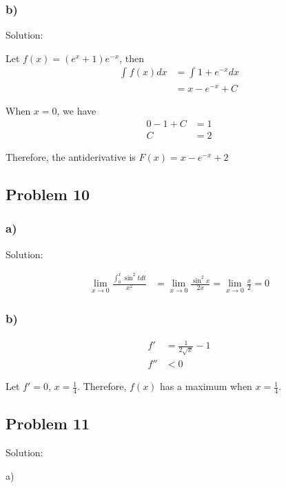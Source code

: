 \documentclass[letterpaper, 11pt]{article}
\newcommand{\1}{\mathds{1}}	%
\theoremstyle{definition}
\begin{document}
\subsubsection*{b)}

Solution:

Let $f(x) = (e ^{x} + 1) e ^{-x}$, then
\begin{align*}
  \int_{}^{} f(x) dx &= \int_{}^{} 1 + e ^{-x} dx \\
  &= x - e ^{-x} + C
\end{align*}

When $x = 0$, we have \begin{align*}
  0 - 1 + C &= 1 \\
  C &= 2
\end{align*}

Therefore, the antiderivative is $F(x) = x - e ^{ -x } + 2$

\subsection*{Problem 10}

\subsubsection*{a)}

Solution:

\begin{align*}
  \lim_{x \to 0}\frac{\int_{0}^{x}\sin ^{2} t dt}{x ^{2}} &=\lim_{x \to 0} \frac{\sin ^{2} x}{2x} = \lim_{x \to 0} \frac{x}{2} = 0
\end{align*}

\subsubsection*{b)}

\begin{align*}
  f' &= \frac{1}{2 \sqrt{x}} - 1 \\
  f'' &< 0 
\end{align*}

Let $f' = 0$, $x = \frac{1}{4}$. Therefore, $f(x)$ has a maximum when $x = \frac{1}{4}$.


\subsection*{Problem 11}

Solution:

a)
\end{document}
